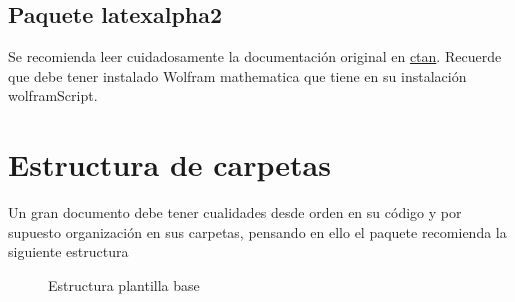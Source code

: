 {	\subsection{Paquete latexalpha2}
	Se recomienda leer cuidadosamente la documentación original en \href{https://www.ctan.org/pkg/latexalpha2}{ctan}. Recuerde que debe tener instalado Wolfram mathematica que tiene en su instalación wolframScript.
	\section{Estructura de carpetas} 
	Un gran documento debe tener cualidades desde orden en su código y por supuesto organización en sus carpetas, pensando en ello el paquete \printproject\space recomienda la siguiente estructura
	\begin{figure}[H]
		\caption{Estructura plantilla base}
		\label{fig:estructuraCarpetasBase}
	\end{figure}
}
